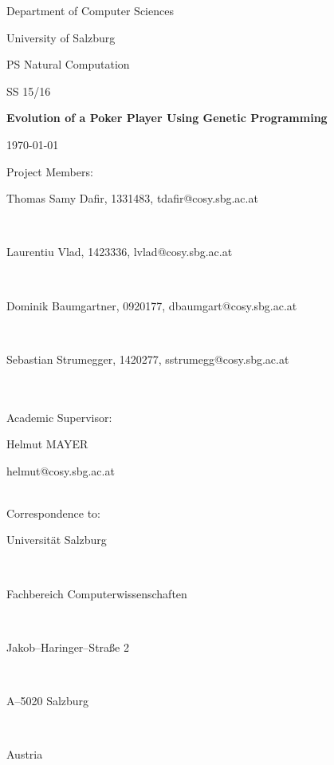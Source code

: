 \documentclass[12pt,fleqn,a4paper]{article}
\begin{document}
\begin{titlepage}%
\vspace{2cm}
\centerline{
\large{Department of Computer Sciences}}
\vspace{0.2cm}
\centerline{\large{University of Salzburg}}%
\vspace{2cm}

\centerline{\large{PS Natural Computation}}
\centerline{SS 15/16}
\vspace{1cm}

\centerline{\Large{\bf{Evolution of a Poker Player Using Genetic Programming}} }%
\vspace{1cm}

\vspace{0.4cm}%
\centerline{\today}
\vspace{4.5cm}%

\vspace{0.2cm}
Project Members:\\
\centerline{Thomas Samy Dafir, 1331483, tdafir@cosy.sbg.ac.at}\\
\centerline{Laurentiu Vlad, 1423336, lvlad@cosy.sbg.ac.at}\\
\centerline{Dominik Baumgartner, 0920177, dbaumgart@cosy.sbg.ac.at}\\
\centerline{Sebastian Strumegger, 1420277, sstrumegg@cosy.sbg.ac.at}\\
\vspace {1cm}\\

Academic Supervisor: \\
\centerline{Helmut MAYER}
\centerline{helmut@cosy.sbg.ac.at}
\vspace{1.5cm}\\
Correspondence to: \\
\centerline{Universit\"{a}t Salzburg} \\
\centerline{Fachbereich Computerwissenschaften} \\
\centerline{Jakob--Haringer--Stra\ss e 2} \\
\centerline{A--5020 Salzburg} \\
\centerline{Austria}
\clearpage
\end{titlepage}

\setcounter{page}{1}
\tableofcontents

\clearpage
\pagestyle{headings}
\setcounter{page}{1}
\setcounter{page}{1}
\end{document}
